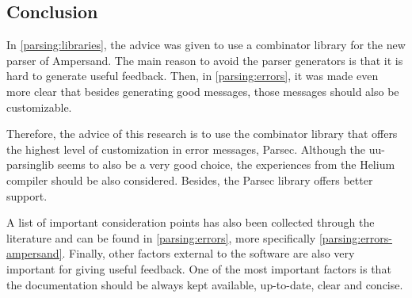 
\subsection{Conclusion}
\label{parsing:conclusion}
In \autoref{parsing:libraries}, the advice was given to use a combinator library for the new parser of Ampersand.
The main reason to avoid the parser generators is that it is hard to generate useful feedback.
Then, in \autoref{parsing:errors}, it was made even more clear that besides generating good messages, those messages should also be customizable.

Therefore, the advice of this research is to use the combinator library that offers the highest level of customization in error messages, Parsec.
Although the uu-parsinglib seems to also be a very good choice, the experiences from the Helium compiler  should be also considered.
Besides, the Parsec library offers better support.

A list of important consideration points has also been collected through the literature and can be found in \autoref{parsing:errors}, more specifically \ref{parsing:errors-ampersand}.
Finally, other factors external to the software are also very important for giving useful feedback.
One of the most important factors is that the documentation should be always kept available, up-to-date, clear and concise.
